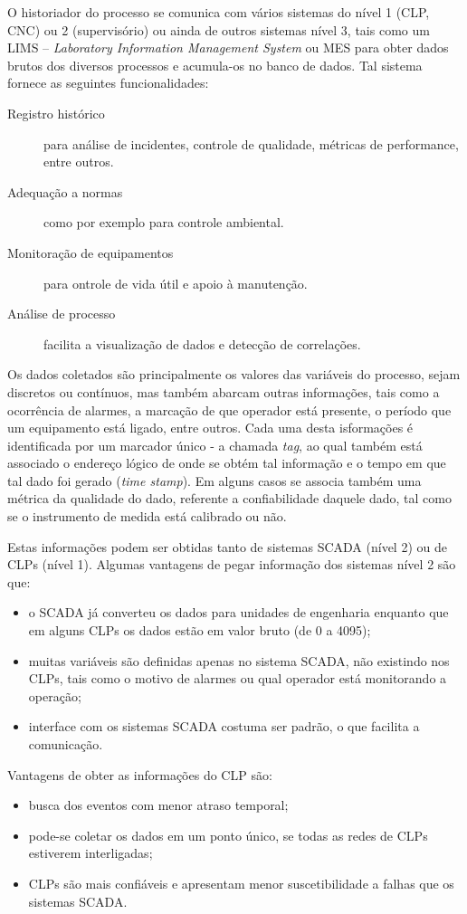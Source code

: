 O historiador do processo se comunica com vários sistemas do nível 1 (CLP, CNC) ou 2 (supervisório) ou ainda de outros sistemas nível 3, tais como um LIMS -- \emph{Laboratory Information Management System} ou MES para obter dados brutos dos diversos processos e acumula-os no banco de dados. Tal sistema fornece as seguintes funcionalidades:
\begin{description}
 	\item[Registro histórico] para análise de incidentes, controle de qualidade, métricas de performance, entre outros.
 	\item[Adequação a normas] como por exemplo para controle ambiental.
 	\item[Monitoração de equipamentos] para ontrole de vida útil e apoio à manutenção.
 	\item[Análise de processo] facilita a visualização de dados e detecção de correlações.
 \end{description}  			

Os dados coletados são principalmente os valores das variáveis do processo, sejam discretos ou contínuos, mas também abarcam outras informações, tais como a ocorrência de alarmes, a marcação de que operador está presente, o período que um equipamento está ligado, entre outros. Cada uma desta isformações é identificada por um marcador único - a chamada \emph{tag}, ao qual também está associado o endereço lógico de onde se obtém tal informação e o tempo em que tal dado foi gerado (\emph{time stamp}). Em alguns casos se associa também uma métrica da qualidade do dado, referente a confiabilidade daquele dado, tal como se o instrumento de medida está calibrado ou não.

Estas informações podem ser obtidas tanto de sistemas SCADA (nível 2) ou de CLPs (nível 1). Algumas vantagens de pegar informação dos sistemas nível 2 são que: 
\begin{itemize}
	\item o SCADA já converteu os dados para unidades de engenharia enquanto que em alguns CLPs os dados estão em valor bruto (de 0 a 4095);
	\item muitas variáveis são definidas apenas no sistema SCADA, não existindo nos CLPs, tais como o motivo de alarmes ou qual operador está monitorando a operação;
	\item  interface com os sistemas SCADA costuma ser padrão, o que facilita a comunicação.
\end{itemize}

Vantagens de obter as informações do CLP são:
\begin{itemize}
	\item busca dos eventos com menor atraso temporal;
	\item pode-se coletar os dados em um ponto único, se todas as redes de CLPs estiverem interligadas;
	\item CLPs são mais confiáveis e apresentam menor suscetibilidade a falhas que os sistemas SCADA.
\end{itemize}


